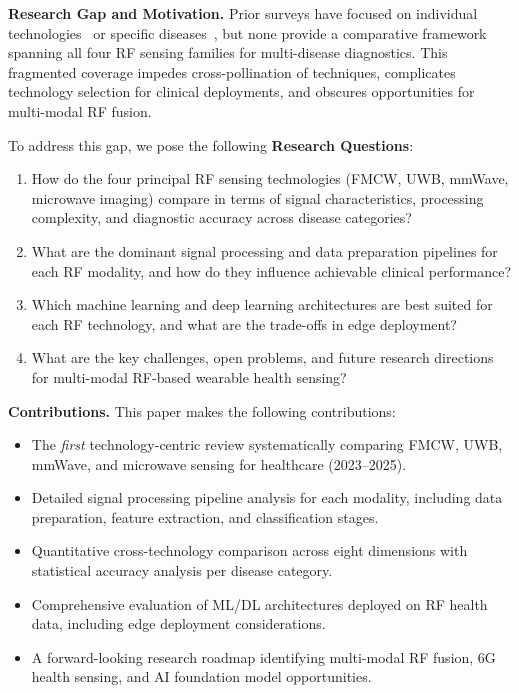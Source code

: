 \documentclass[journal,twoside]{IEEEtran}
\begin{document}
\textbf{Research Gap and Motivation.} Prior surveys have focused on individual technologies~\cite{ref_fmcw_survey2023, ref_uwb_overview2024} or specific diseases~\cite{ref_cardiac_review2024}, but none provide a comparative framework spanning all four RF sensing families for multi-disease diagnostics. This fragmented coverage impedes cross-pollination of techniques, complicates technology selection for clinical deployments, and obscures opportunities for multi-modal RF fusion.

To address this gap, we pose the following \textbf{Research Questions}:
\begin{enumerate}
\item[\textbf{RQ1:}] How do the four principal RF sensing technologies (FMCW, UWB, mmWave, microwave imaging) compare in terms of signal characteristics, processing complexity, and diagnostic accuracy across disease categories?
\item[\textbf{RQ2:}] What are the dominant signal processing and data preparation pipelines for each RF modality, and how do they influence achievable clinical performance?
\item[\textbf{RQ3:}] Which machine learning and deep learning architectures are best suited for each RF technology, and what are the trade-offs in edge deployment?
\item[\textbf{RQ4:}] What are the key challenges, open problems, and future research directions for multi-modal RF-based wearable health sensing?
\end{enumerate}

\textbf{Contributions.} This paper makes the following contributions:
\begin{itemize}
\item The \emph{first} technology-centric review systematically comparing FMCW, UWB, mmWave, and microwave sensing for healthcare (2023--2025).
\item Detailed signal processing pipeline analysis for each modality, including data preparation, feature extraction, and classification stages.
\item Quantitative cross-technology comparison across eight dimensions with statistical accuracy analysis per disease category.
\item Comprehensive evaluation of ML/DL architectures deployed on RF health data, including edge deployment considerations.
\item A forward-looking research roadmap identifying multi-modal RF fusion, 6G health sensing, and AI foundation model opportunities.
\end{itemize}
\end{document}
